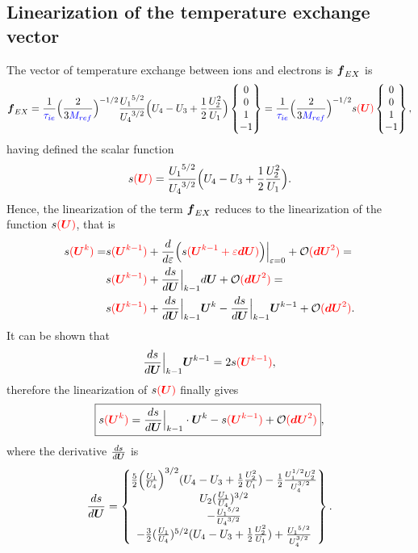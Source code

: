 \documentclass[a4paper,10pt]{article}
\newcommand{\bm}[1]{\text{\boldmath$#1$\unboldmath}}
\newcommand{\DiscFunc}[1]{\bm{#1}}
\renewcommand{\u}{\DiscFunc{U}}
\newcommand{\nd}[1]{{\color{blue} #1\color{black}}} %
\newcommand{\fo}[1]{{ \color{red} ( #1 )\color{black} }} %
\def\Mref{\nd{M_{ref}}}
\def\tiea{\nd{\tau_{ie}}}
\begin{document}
\subsection{Linearization of the temperature exchange vector}
The vector of temperature exchange between ions and electrons is $\bm{f}_{EX}$ is
\begin{equation*}
 \bm{f}_{EX}  =  \frac{1}{\tiea}\Big(\frac{2}{3  \Mref }\Big)^{-1/2}\frac{{U_1}^{5/2}}{{U_4}^{3/2}}\Big(U_4-U_3 + \frac{1}{2}\frac{U_2^2}{U_1}\Big)            \begin{Bmatrix}
                     0 \\
                     0\\
                     1\\
                    -1
       \end{Bmatrix}=  \frac{1}{\tiea}\Big(\frac{2}{3  \Mref }\Big)^{-1/2}s\fo{\u}            \begin{Bmatrix}
                     0 \\
                     0\\
                     1\\
                    -1
       \end{Bmatrix},
\end{equation*}
having defined the scalar function
\[
s\fo{\u}=\frac{{U_1}^{5/2}}{{U_4}^{3/2}}\Big(U_4-U_3 + \frac{1}{2}\frac{U_2^2}{U_1}\Big).
\]
Hence, the linearization of the term $\bm{f}_{EX}$ reduces to the linearization of the function $s\fo{\u}$, that is
\begin{equation*}
\begin{split}
 s\fo{\u^k} = &s\fo{\u^{k-1}}+\frac{d}{d\varepsilon}\Big(s\fo{\u^{k-1}+\varepsilon\bm{dU}}\Big)\Big|_{\varepsilon=0}+\mathcal{O}\fo{\bm{dU}^2} = \\
 &s\fo{\u^{k-1}}+\frac{d s}{d\u}\Big|_{k-1}d\u+\mathcal{O}\fo{\bm{dU}^2}=\\        
 &s\fo{\u^{k-1}}+\frac{d s}{d\u}\Big|_{k-1}\u^k-\frac{d s}{d\u}\Big|_{k-1} \u^{k-1}+\mathcal{O}\fo{\bm{dU}^2}.
\end{split}
\end{equation*}
It can be shown that
\begin{equation*}
 \frac{d s}{d\u}\Big|_{k-1} \u^{k-1} = 2 s\fo{\u^{k-1}},
\end{equation*}
therefore the linearization of $s\fo{\u}$ finally gives
\[
\boxed{
 s\fo{\u^k} = \frac{d s}{d\u}\Big|_{k-1}\cdot\u^k - s\fo{\u^{k-1}}+\mathcal{O}\fo{\bm{dU}^2}
 },
\]
where the derivative $\frac{d s}{d\u}$ is
\begin{equation*}
 \frac{d s}{d\u} = \begin{Bmatrix}
   \frac{5}{2} \Big(\frac{U_1}{U_4}\Big)^{3/2} (U_4-U_3 +\frac{1}{2}\frac{U_2^2}{U_1}) - \frac{1}{2} \frac{U_1^{1/2}U_2^2}{U_4^{3/2}}\\
   U_2(\frac{U_1}{U_4})^{3/2}\\
   -\frac{{U_1}^{5/2}}{{U_4}^{3/2}} \\
   -\frac{3}{2}(\frac{U_1}{U_4})^{5/2}(U_4 -U_3+\frac{1}{2}\frac{U_2^2}{U_1})+\frac{{U_1}^{5/2}}{U_4^{3/2}}
                        \end{Bmatrix}.
\end{equation*}
\end{document}
